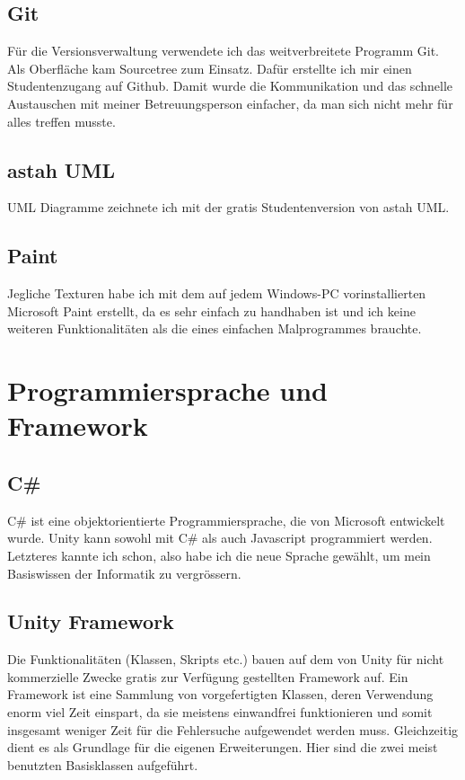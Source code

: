 \subsection{Git}

Für die Versionsverwaltung verwendete ich das weitverbreitete Programm Git.
Als Oberfläche kam Sourcetree zum Einsatz.
Dafür erstellte ich mir einen Studentenzugang auf Github.
Damit wurde die Kommunikation und das schnelle Austauschen mit meiner Betreuungsperson einfacher, da man sich nicht mehr für alles treffen musste.

\subsection{astah UML}

UML Diagramme zeichnete ich mit der gratis Studentenversion von astah UML.

\subsection{Paint}
Jegliche Texturen habe ich mit dem auf jedem Windows-PC vorinstallierten  Microsoft Paint erstellt, da es sehr einfach zu handhaben ist und ich keine weiteren Funktionalitäten als die eines einfachen Malprogrammes brauchte.

\section{Programmiersprache und Framework}

\subsection{C\#}
C\# ist eine objektorientierte Programmiersprache, die von Microsoft entwickelt wurde.
Unity kann sowohl mit C\# als auch Javascript programmiert werden.
Letzteres kannte ich schon, also habe ich die neue Sprache gewählt, um mein Basiswissen der Informatik zu vergrössern.

\subsection{Unity Framework}
Die Funktionalitäten (Klassen, Skripts etc.) bauen auf dem von Unity für nicht kommerzielle Zwecke gratis zur Verfügung gestellten Framework auf.
Ein Framework ist eine Sammlung von vorgefertigten Klassen, deren Verwendung enorm viel Zeit einspart, da sie meistens einwandfrei funktionieren und somit insgesamt weniger Zeit für die Fehlersuche aufgewendet werden muss. Gleichzeitig dient es als Grundlage für die eigenen Erweiterungen.
Hier sind die zwei meist benutzten Basisklassen aufgeführt.

